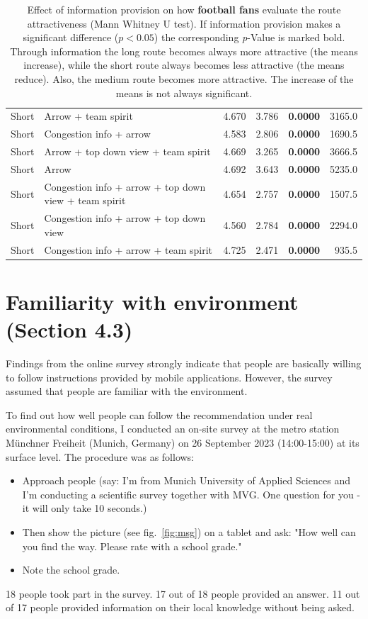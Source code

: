 \begin{table}
\begin{scriptsize}
\begin{tabular}{llrrrr}
 Short & Arrow + team spirit & 4.670 & 3.786 & \textbf{0.0000} & 3165.0 \\ 
 Short & Congestion info + arrow & 4.583 & 2.806 & \textbf{0.0000} & 1690.5 \\ 
 Short & Arrow + top down view + team spirit & 4.669 & 3.265 & \textbf{0.0000} & 3666.5 \\ 
 Short & Arrow & 4.692 & 3.643 & \textbf{0.0000} & 5235.0 \\ 
 Short & Congestion info + arrow + top down view + team spirit & 4.654 & 2.757 & \textbf{0.0000} & 1507.5 \\ 
 Short & Congestion info + arrow + top down view & 4.560 & 2.784 & \textbf{0.0000} & 2294.0 \\ 
 Short & Congestion info + arrow + team spirit & 4.725 & 2.471 & \textbf{0.0000} & 935.5 \\ 
   \hline
\end{tabular}
\end{scriptsize}
\caption{Effect of information provision on how \textbf{football fans} evaluate the route attractiveness (Mann Whitney U test). If information provision makes a significant difference ($p<0.05$) the corresponding \textit{p}-Value is marked bold. Through information the long route becomes always more attractive (the means increase), while the short route always becomes less attractive (the means reduce). Also, the medium route becomes more attractive. The increase of the means is not always significant.}
\label{tab:surveyS2D}
\end{table}



\chapter{Familiarity with environment (Section 4.3)}
\label{sec:navigation}

Findings from the online survey strongly indicate that people are basically willing to follow instructions provided by mobile applications. However, the survey assumed that people are familiar with the environment.

To find out how well people can follow the recommendation under real environmental conditions, I conducted an on-site survey at the metro station Münchner Freiheit (Munich, Germany) on 26 September 2023 (14:00-15:00) at its surface level. The procedure was as follows:
\begin{itemize}
\item Approach people (say: I'm from Munich University of Applied Sciences and I'm conducting a scientific survey together with MVG. One question for you - it will only take 10 seconds.)
\item Then show the picture (see fig.~\ref{fig:msg}) on a tablet and ask: "How well can you find the way. Please rate with a school grade."
\item Note the school grade.
\end{itemize}
18 people took part in the survey. 17 out of 18 people provided an answer. 11 out of 17 people provided information on their local knowledge without being asked.

